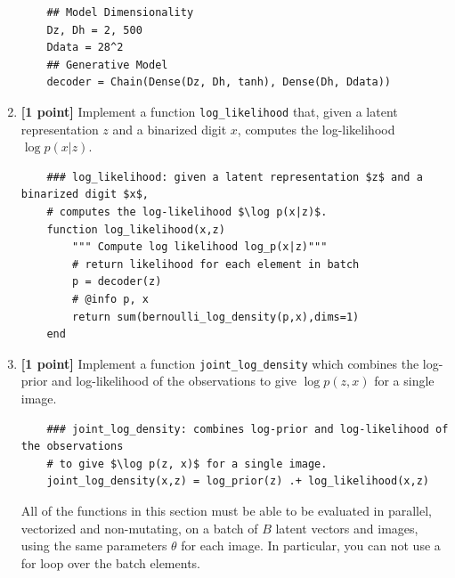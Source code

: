 \documentclass{article}
\begin{document}
\begin{enumerate}[label=(\alph*)]
	\begin{lstlisting}
	## Model Dimensionality
	Dz, Dh = 2, 500
	Ddata = 28^2
	## Generative Model
	decoder = Chain(Dense(Dz, Dh, tanh), Dense(Dh, Ddata))
	\end{lstlisting}
	
	
	\item {\bf [1 point]} Implement a function \texttt{log\_likelihood} that, given a latent representation $z$ and a binarized digit $x$, computes the log-likelihood $\log p(x|z)$.
	
	\begin{lstlisting}
	### log_likelihood: given a latent representation $z$ and a binarized digit $x$,
	# computes the log-likelihood $\log p(x|z)$.
	function log_likelihood(x,z)
		""" Compute log likelihood log_p(x|z)"""
		# return likelihood for each element in batch
		p = decoder(z)
		# @info p, x
		return sum(bernoulli_log_density(p,x),dims=1)
	end
	\end{lstlisting}	
	
   	\item {\bf [1 point]} Implement a function \texttt{joint\_log\_density} which combines the log-prior and log-likelihood of the observations to give $\log p(z, x)$ for a single image.
	
	\begin{lstlisting}
	### joint_log_density: combines log-prior and log-likelihood of the observations
	# to give $\log p(z, x)$ for a single image. 
	joint_log_density(x,z) = log_prior(z) .+ log_likelihood(x,z)
	\end{lstlisting}

All of the functions in this section must be able to be evaluated in parallel, vectorized and non-mutating, on a batch of $B$ latent vectors and images, using the same parameters $\theta$ for each image.
In particular, you can not use a for loop over the batch elements.
  
\end{enumerate}

\pagebreak
\end{document}
